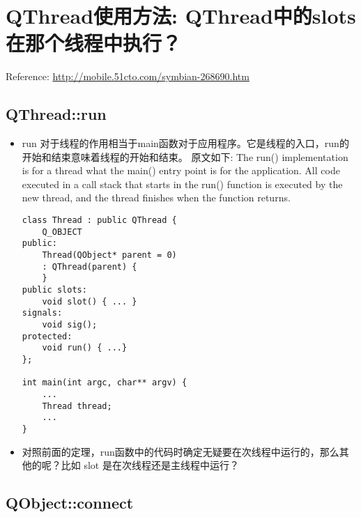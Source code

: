 \documentclass[9pt,b5paper]{article}
\begin{document}
\section{QThread使用方法: QThread中的slots在那个线程中执行？}
\label{sec-3}
Reference: \url{http://mobile.51cto.com/symbian-268690.htm}
\subsection{QThread::run}
\label{sec-3-1}
\begin{itemize}
\item run 对于线程的作用相当于main函数对于应用程序。它是线程的入口，run的开始和结束意味着线程的开始和结束。 原文如下: The run() implementation is for a thread what the main() entry point is for the application. All code executed in a call stack that starts in the run() function is executed by the new thread, and the thread finishes when the function returns.  
\lstset{language=java,label= ,caption= ,numbers=none}
\begin{lstlisting}
class Thread : public QThread {       
    Q_OBJECT
public:       
    Thread(QObject* parent = 0)
	: QThread(parent) {
    }
public slots:       
    void slot() { ... }
signals:       
    void sig();
protected:       
    void run() { ...}
};    

int main(int argc, char** argv) {
    ...
    Thread thread;
    ...
}
\end{lstlisting}
\item 对照前面的定理，run函数中的代码时确定无疑要在次线程中运行的，那么其他的呢？比如 slot 是在次线程还是主线程中运行？
\end{itemize}
\subsection{QObject::connect}
\label{sec-3-2}
\end{document}

